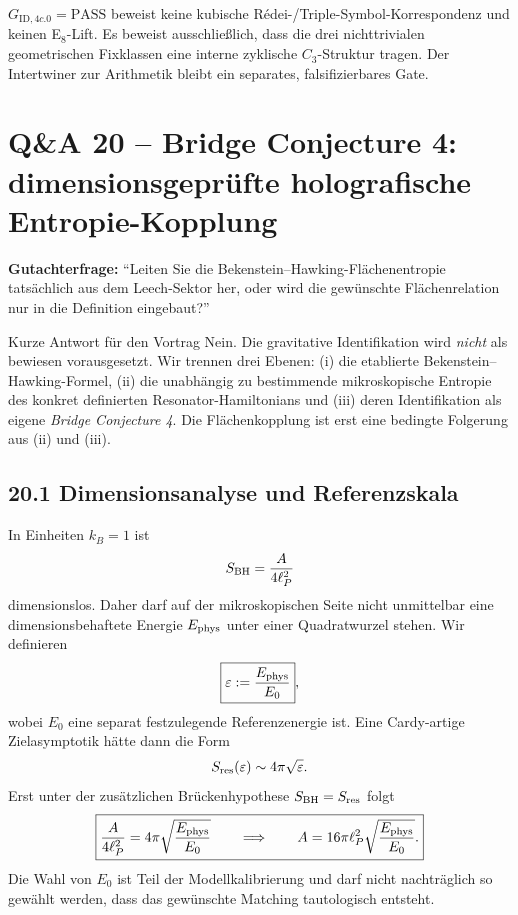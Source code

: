 \documentclass[11pt,a4paper]{article}
\begin{document}
\begin{warningbox}
$G_{\mathrm{ID},4c.0}=\mathrm{PASS}$ beweist keine kubische Rédei-/Triple-Symbol-Korrespondenz und keinen E$_8$-Lift. Es beweist ausschließlich, dass die drei nichttrivialen geometrischen Fixklassen eine interne zyklische $C_3$-Struktur tragen. Der Intertwiner zur Arithmetik bleibt ein separates, falsifizierbares Gate.
\end{warningbox}

\newpage
\section*{Q\&A 20 -- Bridge Conjecture 4: dimensionsgeprüfte holografische Entropie-Kopplung}

\textbf{Gutachterfrage:} ``Leiten Sie die Bekenstein--Hawking-Flächenentropie tatsächlich aus dem Leech-Sektor her, oder wird die gewünschte Flächenrelation nur in die Definition eingebaut?''

\begin{statusbox}{Kurze Antwort für den Vortrag}
Nein. Die gravitative Identifikation wird \emph{nicht} als bewiesen vorausgesetzt. Wir trennen drei Ebenen: (i) die etablierte Bekenstein--Hawking-Formel, (ii) die unabhängig zu bestimmende mikroskopische Entropie des konkret definierten Resonator-Hamiltonians und (iii) deren Identifikation als eigene \emph{Bridge Conjecture 4}. Die Flächenkopplung ist erst eine bedingte Folgerung aus (ii) und (iii).
\end{statusbox}

\subsection*{20.1 Dimensionsanalyse und Referenzskala}
In Einheiten $k_B=1$ ist
\[
S_{\rm BH}=\frac{A}{4\ell_P^2}
\]
dimensionslos. Daher darf auf der mikroskopischen Seite nicht unmittelbar eine dimensionsbehaftete Energie $E_{\rm phys}$ unter einer Quadratwurzel stehen. Wir definieren
\[
\boxed{\varepsilon:=\frac{E_{\rm phys}}{E_0}},
\]
wobei $E_0$ eine separat festzulegende Referenzenergie ist. Eine Cardy-artige Zielasymptotik hätte dann die Form
\[
S_{\rm res}(\varepsilon)\sim 4\pi\sqrt{\varepsilon}.
\]
Erst unter der zusätzlichen Brückenhypothese $S_{\rm BH}=S_{\rm res}$ folgt
\[
\boxed{\frac{A}{4\ell_P^2}=4\pi\sqrt{\frac{E_{\rm phys}}{E_0}}
\qquad\Longrightarrow\qquad
A=16\pi\ell_P^2\sqrt{\frac{E_{\rm phys}}{E_0}}.}
\]
Die Wahl von $E_0$ ist Teil der Modellkalibrierung und darf nicht nachträglich so gewählt werden, dass das gewünschte Matching tautologisch entsteht.
\end{document}
